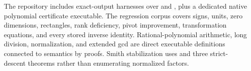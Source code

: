 The repository includes exact-output  harnesses over 
and , plus a dedicated native polynomial certificate
executable. The regression corpus covers signs, units, zero dimensions,
rectangles, rank deficiency, pivot improvement, transformation equations, and
every stored inverse identity. Rational-polynomial arithmetic, long division,
normalization, and extended gcd are direct executable definitions connected
to \mathlib{} semantics by proofs. Smith stabilization uses
 and three strict-descent theorems rather
than enumerating normalized factors.
